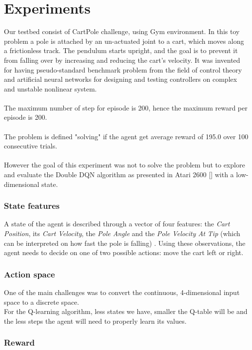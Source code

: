 \section{Experiments}

Our testbed consist of CartPole challenge, using Gym environment.
In this toy problem a pole is attached by an un-actuated joint to a cart, which moves along a frictionless track. The pendulum starts upright, and the goal is to prevent it from falling over by increasing and reducing the cart's velocity. It was invented for having pseudo-standard benchmark problem from the field of control theory and artificial neural networks for designing and testing controllers on complex and unstable nonlinear system.
\\\\The maximum number of step for episode is 200, hence the maximum reward per episode is 200.
\\\\The problem is defined "solving" if the agent get average reward of 195.0 over 100 consecutive trials. 
\\\\However the goal of this experiment was not to solve the problem but to explore and evaluate the Double DQN algorithm as presented in Atari 2600 [] with a low-dimensional state.
 
\subsubsection{State features}

A state of the agent is described through a vector of four features: the  \textit{Cart Position}, its \textit{Cart Velocity}, the \textit{Pole Angle} and the \textit{Pole Velocity At Tip} (which can be interpreted on how fast the pole is falling) .
Using these observations, the agent needs to decide on one of two possible actions: move the cart left or right.

\subsubsection{Action space}
One of the main challenges was to convert the continuous, 4-dimensional input space to a discrete space. 
\\For the Q-learning algorithm, less states we have, smaller the Q-table will be and the less steps the agent will need to properly learn its values. 

\subsubsection{Reward}

